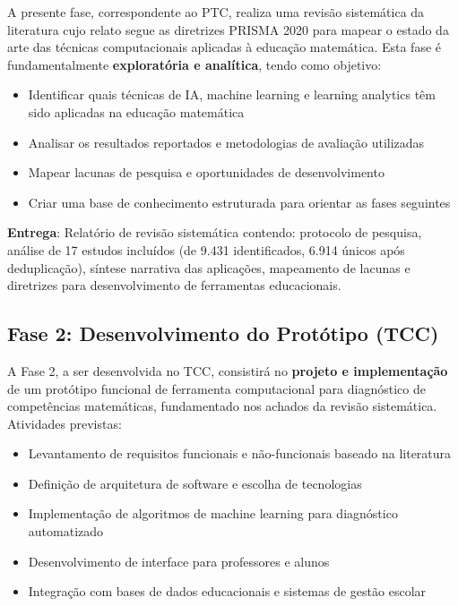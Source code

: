A presente fase, correspondente ao PTC, realiza uma revisão sistemática da literatura cujo relato segue as diretrizes PRISMA 2020 para mapear o estado da arte das técnicas computacionais aplicadas à educação matemática. Esta fase é fundamentalmente \textbf{exploratória e analítica}, tendo como objetivo:

\begin{itemize}
    \item Identificar quais técnicas de IA, machine learning e learning analytics têm sido aplicadas na educação matemática
    \item Analisar os resultados reportados e metodologias de avaliação utilizadas
    \item Mapear lacunas de pesquisa e oportunidades de desenvolvimento
    \item Criar uma base de conhecimento estruturada para orientar as fases seguintes
\end{itemize}

\textbf{Entrega}: Relatório de revisão sistemática contendo: protocolo de pesquisa, análise de 17 estudos incluídos (de 9.431 identificados, 6.914 únicos após deduplicação), síntese narrativa das aplicações, mapeamento de lacunas e diretrizes para desenvolvimento de ferramentas educacionais.

\subsection{Fase 2: Desenvolvimento do Protótipo (TCC)}

A Fase 2, a ser desenvolvida no TCC, consistirá no \textbf{projeto e implementação} de um protótipo funcional de ferramenta computacional para diagnóstico de competências matemáticas, fundamentado nos achados da revisão sistemática. Atividades previstas:

\begin{itemize}
    \item Levantamento de requisitos funcionais e não-funcionais baseado na literatura
    \item Definição de arquitetura de software e escolha de tecnologias
    \item Implementação de algoritmos de machine learning para diagnóstico automatizado
    \item Desenvolvimento de interface para professores e alunos
    \item Integração com bases de dados educacionais e sistemas de gestão escolar
\end{itemize}

